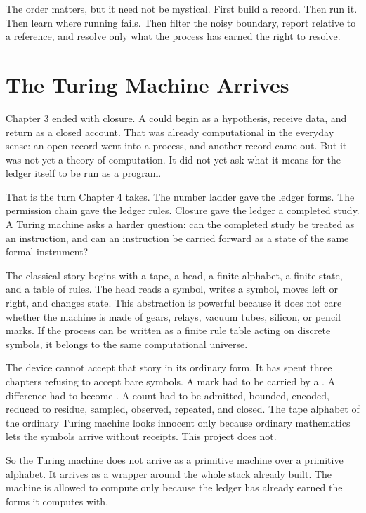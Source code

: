 The order matters, but it need not be mystical. First build a record. Then run
it. Then learn where running fails. Then filter the noisy boundary, report
relative to a reference, and resolve only what the process has earned the right
to resolve.

\section{The Turing Machine Arrives}
\label{se:turing-machine-arrives}

Chapter 3 ended with closure. A  could begin as a hypothesis,
receive data, and return as a closed account. That was already computational in
the everyday sense: an open record went into a process, and another record came
out. But it was not yet a theory of computation. It did not yet ask what it
means for the ledger itself to be run as a program.

That is the turn Chapter 4 takes. The number ladder gave the ledger forms. The
permission chain gave the ledger rules. Closure gave the ledger a completed
study. A Turing machine asks a harder question: can the completed study be
treated as an instruction, and can an instruction be carried forward as a state
of the same formal instrument?

The classical story begins with a tape, a head, a finite alphabet, a finite
state, and a table of rules. The head reads a symbol, writes a symbol, moves
left or right, and changes state. This abstraction is powerful because it does
not care whether the machine is made of gears, relays, vacuum tubes, silicon,
or pencil marks. If the process can be written as a finite rule table acting
on discrete symbols, it belongs to the same computational universe.

The device cannot accept that story in its ordinary form. It has spent three
chapters refusing to accept bare symbols. A mark had to be carried by a
. A difference had to become . A
count had to be admitted, bounded, encoded, reduced to residue, sampled,
observed, repeated, and closed. The tape alphabet of the ordinary Turing
machine looks innocent only because ordinary mathematics lets the symbols
arrive without receipts. This project does not.

So the Turing machine does not arrive as a primitive machine over a primitive
alphabet. It arrives as a wrapper around the whole stack already built. The
machine is allowed to compute only because the ledger has already earned the
forms it computes with.

